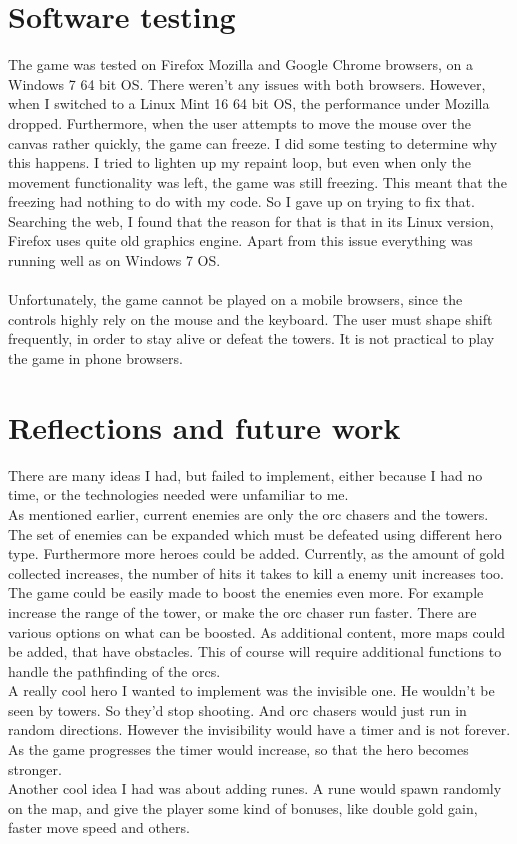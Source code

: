 \documentclass[a4paper]{article}
\begin{document}
\section{Software testing}
The game was tested on Firefox Mozilla and Google Chrome browsers, on a Windows 7 64 bit OS. There weren't any issues with both browsers. However, when I switched to a Linux Mint 16 64 bit OS, the performance under Mozilla dropped. Furthermore, when the user attempts to move the mouse over the canvas rather quickly, the game can freeze. I did some testing to determine why this happens. I tried to lighten up my repaint loop, but even when only the movement functionality was left, the game was still freezing. This meant that the freezing had nothing to do with my code. So I gave up on trying to fix that. Searching the web, I found that the reason for that is that in its Linux version, Firefox uses quite old graphics engine.  Apart from this issue everything was running well as on Windows 7 OS. \\ \\
Unfortunately, the game cannot be played on a mobile browsers, since the controls highly rely on the mouse and the keyboard. The user must shape shift frequently, in order to stay alive or defeat the towers. It is not practical to play the game in phone browsers.

\section{Reflections and future work }
There are many ideas I had, but failed to implement, either because I had no time, or the technologies needed were unfamiliar to me. \\ 
As mentioned earlier, current enemies are only the orc chasers and the towers. The set of enemies can be expanded which must be defeated using different hero type. Furthermore more heroes could be added. Currently, as the amount of gold collected increases, the number of hits it takes to kill a enemy unit increases too. The game could be easily made to boost the enemies even more. For example increase the range of the tower, or make the orc chaser run faster. There are various options on what can be boosted. As additional content, more maps could be added, that have obstacles. This of course will require additional functions to handle the pathfinding of the orcs. \\ 
A really cool hero I wanted to implement was the invisible one. He wouldn't be seen by towers. So they'd stop shooting. And orc chasers would just run in random directions. However the invisibility would have a timer and is not forever. As the game progresses the timer would increase, so that the hero becomes stronger. \\
Another cool idea I had was about adding runes. A rune would spawn randomly on the map, and give the player some kind of bonuses, like double gold gain, faster move speed and others.
\end{document}
